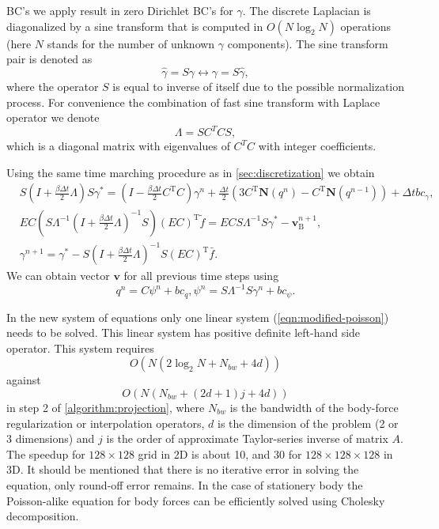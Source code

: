 \documentclass{article}
\numberwithin{equation}{section}
\begin{document}
BC's we apply result in zero Dirichlet BC's for $\gamma$. The discrete Laplacian is diagonalized by a sine transform that is computed in $O(N \log_2 N)$ operations (here $N$ stands for the number of unknown $\gamma$ components). The sine transform pair is denoted as 
\begin{equation}
  \hat\gamma = S\gamma\leftrightarrow\gamma=S\hat\gamma,
\end{equation} 
where the operator $S$ is equal to inverse of itself due to the possible normalization process. For convenience the combination of fast sine transform with Laplace operator we denote 
\begin{equation}
  \Lambda = SC^TCS,
\end{equation}
which is a diagonal matrix with eigenvalues of $C^TC$ with integer coefficients. 

Using the same time marching procedure as in \cref{sec:discretization} we obtain 
\begin{align}
& S\left(I+\frac{\beta \Delta t}{2} \Lambda\right) S \gamma^*=\left(I-\frac{\beta \Delta t}{2} C^{\mathrm{T}} C\right) \gamma^n +\frac{\Delta t}{2}\left(3 C^{\mathrm{T}} \mathbf{N}\left(q^n\right)-C^{\mathrm{T}} \mathbf{N}\left(q^{n-1}\right)\right)  +\Delta t b c_\gamma, \\
& E C\left(S \Lambda^{-1}\left(I+\frac{\beta \Delta t}{2} \Lambda\right)^{-1} S\right)(E C)^{\mathrm{T}} \tilde{f}=E C S \Lambda^{-1} S \gamma^*-\boldsymbol{v}_{\mathrm{B}}^{n+1},\label{eqn:modified-poisson} \\
& \gamma^{n+1}=\gamma^*-S\left(I+\frac{\beta \Delta t}{2} \Lambda\right)^{-1} S(E C)^{\mathrm{T}} \bar{f}.
\end{align}
We can obtain vector $\boldsymbol{v}$ for all previous time steps using
\begin{equation}
	q^n=C\psi^n + bc_q, \psi^n=S\Lambda^{-1}S\gamma^n + bc_\psi.
\end{equation}

In the new system of equations only one linear system (\cref{eqn:modified-poisson}) needs to be solved. This linear system has positive definite left-hand side operator. This system requires 
\begin{equation}
	O(N(2\log_2 N + N_{bw} + 4d))
\end{equation}
against
\begin{equation}
	O(N(N_{bw} + (2d+1)j + 4d))
\end{equation}
in step 2 of \cref{algorithm:projection}, where $N_{bw}$ is the bandwidth of the body-force regularization or interpolation operators, $d$ is the dimension of the problem (2 or 3 dimensions) and $j$ is the order of approximate Taylor-series inverse of matrix $A$. The speedup for $128\times128$ grid  in 2D is about 10, and 30 for $128\times128\times128$ in 3D. It should be mentioned that there is no iterative error in solving the equation, only round-off error remains. In the case of stationery body the Poisson-alike equation for body forces can be efficiently solved using Cholesky decomposition. 
\end{document}
